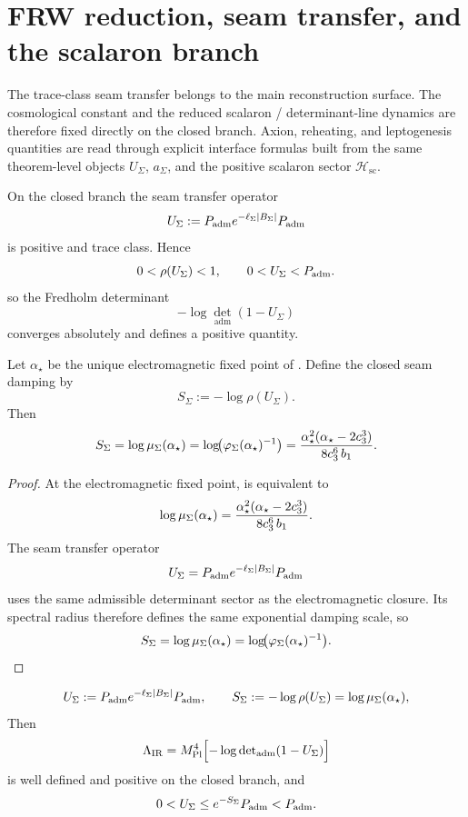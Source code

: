 \section{FRW reduction, seam transfer, and the scalaron branch}
\label{sec:cosmology-closure}

The trace-class seam transfer belongs to the main reconstruction surface. The cosmological
constant and the reduced scalaron / determinant-line dynamics are therefore fixed directly on the
closed branch. Axion, reheating, and leptogenesis quantities are read through explicit interface
formulas built from the same theorem-level objects $U_\Sigma$, $a_\Sigma$, and the positive
scalaron sector $\mathcal H_{\mathrm{sc}}$.

\begin{theorem}
\label{lem:automatic-seam-transfer-convergence}
On the closed branch the seam transfer operator
\[
U_\Sigma:=P_{\mathrm{adm}} e^{-\ell_\Sigma|B_\Sigma|}P_{\mathrm{adm}}
\]
is positive and trace class. Hence
\[
0<\rho(U_\Sigma)<1,
\qquad
0<U_\Sigma<P_{\mathrm{adm}}.
\]
so the Fredholm determinant
\[
-\log\det_{\mathrm{adm}}(1-U_\Sigma)
\]
converges absolutely and defines a positive quantity.
\end{theorem}

\begin{proposition}
\label{prop:seam-action-cosmology}
Let $\alpha_\star$ be the unique electromagnetic fixed point of
. Define the closed seam damping by
\[
S_\Sigma:=-\log\rho(U_\Sigma).
\]
Then
\[
S_\Sigma
=
\log\mu_\Sigma(\alpha_\star)
=
\log\!\bigl(\varphi_{\Sigma}(\alpha_\star)^{-1}\bigr)
=
\frac{\alpha_\star^2(\alpha_\star-2c_3^3)}{8c_3^6\,b_1}.
\]
\end{proposition}

\begin{proof}
At the electromagnetic fixed point,  is equivalent to
\[
\log\mu_\Sigma(\alpha_\star)
=
\frac{\alpha_\star^2(\alpha_\star-2c_3^3)}{8c_3^6\,b_1}.
\]
The seam transfer operator
\[
U_\Sigma=P_{\mathrm{adm}} e^{-\ell_\Sigma|B_\Sigma|}P_{\mathrm{adm}}
\]
uses the same admissible determinant sector as the electromagnetic closure. Its spectral radius
therefore defines the same exponential damping scale, so
\[
S_\Sigma
=
\log\mu_\Sigma(\alpha_\star)
=
\log\!\bigl(\varphi_{\Sigma}(\alpha_\star)^{-1}\bigr).
\]
\end{proof}

\begin{theorem}
\label{thm:cosmology-closure}
\[
U_\Sigma:=P_{\mathrm{adm}} e^{-\ell_\Sigma |B_\Sigma|}P_{\mathrm{adm}},
\qquad
S_\Sigma:=-\log\rho(U_\Sigma)=\log\mu_\Sigma(\alpha_\star),
\]
Then
\[
\Lambda_{\mathrm{IR}}
=
M_{\mathrm{Pl}}^4
\Bigl[-\log\det\nolimits_{\mathrm{adm}}(1-U_\Sigma)\Bigr]
\]
is well defined and positive on the closed branch, and
\[
0<U_\Sigma\le e^{-S_\Sigma}P_{\mathrm{adm}}<P_{\mathrm{adm}}.
\]
\end{theorem}

